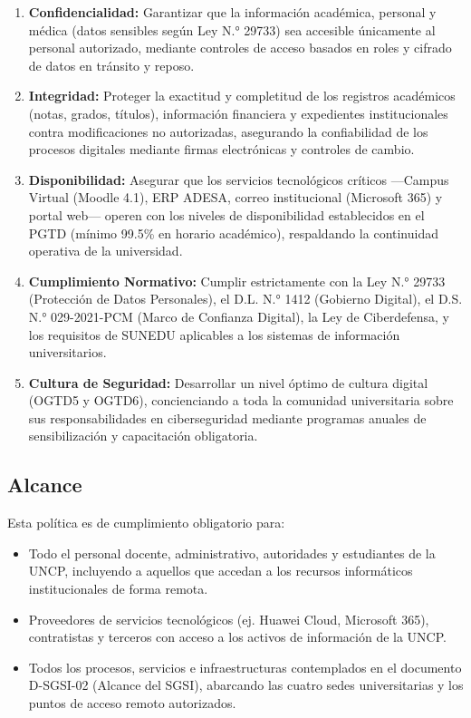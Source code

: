 \documentclass[10pt,letterpaper]{article}
\begin{document}
\begin{enumerate}
\def\labelenumi{\arabic{enumi}.}
\item
  \textbf{Confidencialidad:} Garantizar que la información académica,
  personal y médica (datos sensibles según Ley N.° 29733) sea accesible
  únicamente al personal autorizado, mediante controles de acceso
  basados en roles y cifrado de datos en tránsito y reposo.
\item
  \textbf{Integridad:} Proteger la exactitud y completitud de los
  registros académicos (notas, grados, títulos), información financiera
  y expedientes institucionales contra modificaciones no autorizadas,
  asegurando la confiabilidad de los procesos digitales mediante firmas
  electrónicas y controles de cambio.
\item
  \textbf{Disponibilidad:} Asegurar que los servicios tecnológicos
  críticos ---Campus Virtual (Moodle 4.1), ERP ADESA, correo
  institucional (Microsoft 365) y portal web--- operen con los niveles
  de disponibilidad establecidos en el PGTD (mínimo 99.5\% en horario
  académico), respaldando la continuidad operativa de la universidad.
\item
  \textbf{Cumplimiento Normativo:} Cumplir estrictamente con la Ley N.°
  29733 (Protección de Datos Personales), el D.L. N.° 1412 (Gobierno
  Digital), el D.S. N.° 029-2021-PCM (Marco de Confianza Digital), la
  Ley de Ciberdefensa, y los requisitos de SUNEDU aplicables a los
  sistemas de información universitarios.
\item
  \textbf{Cultura de Seguridad:} Desarrollar un nivel óptimo de cultura
  digital (OGTD5 y OGTD6), concienciando a toda la comunidad
  universitaria sobre sus responsabilidades en ciberseguridad mediante
  programas anuales de sensibilización y capacitación obligatoria.
\end{enumerate}

\subsection{Alcance}\label{alcance}

Esta política es de cumplimiento obligatorio para:

\begin{itemize}
\tightlist
\item
  Todo el personal docente, administrativo, autoridades y estudiantes de
  la UNCP, incluyendo a aquellos que accedan a los recursos informáticos
  institucionales de forma remota.
\item
  Proveedores de servicios tecnológicos (ej. Huawei Cloud, Microsoft
  365), contratistas y terceros con acceso a los activos de información
  de la UNCP.
\item
  Todos los procesos, servicios e infraestructuras contemplados en el
  documento D-SGSI-02 (Alcance del SGSI), abarcando las cuatro sedes
  universitarias y los puntos de acceso remoto autorizados.
\end{itemize}
\end{document}
